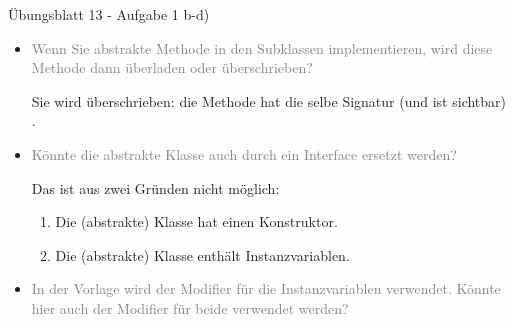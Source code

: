 \begin{frame}[c,fragile]{Übungsblatt 13 - Aufgabe 1 b-d)}
\small\begin{itemize}[<+(1)->]
    \itemsep3pt
    \item \textcolor{gray}{Wenn Sie abstrakte Methode  in den Subklassen implementieren, wird diese Methode dann überladen oder überschrieben?}\smallskip\par\pause
    Sie wird überschrieben: die  Methode hat die selbe Signatur (und ist sichtbar) .
    \item \textcolor{gray}{Könnte die abstrakte Klasse auch durch ein Interface ersetzt werden?}\smallskip\par
    \pause Das ist aus zwei Gründen nicht möglich: \begin{enumerate}
        \item<6-> Die (abstrakte) Klasse hat einen Konstruktor.
        \item<7-> Die (abstrakte) Klasse enthält Instanzvariablen.
    \end{enumerate}
    \item<9-> \textcolor{gray}{In der Vorlage wird der Modifier  für die Instanzvariablen verwendet. Könnte hier auch der Modifier  für beide verwendet werden?}\smallskip\par
\end{itemize}
\end{frame}

